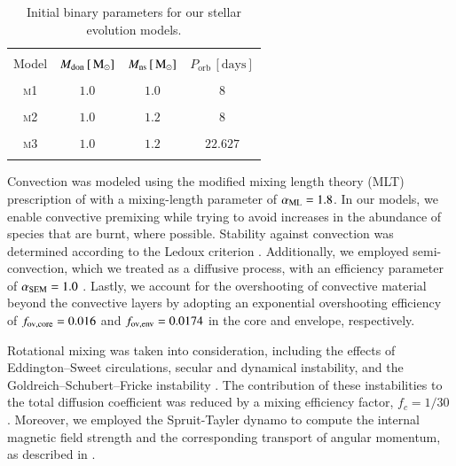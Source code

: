 \documentclass[main.tex]{subfiles}
\begin{document}
        \begin{table}[t]
            \centering
            \caption{Initial binary parameters for our stellar evolution models.}
            \begin{tabular}{cccc}
                 \hline \hline \\
                 Model & $M_\mathrm{don}\,[\mathrm{\,M_\odot}]$ & $M_\mathrm{ns}\,[\mathrm{\,M_\odot}]$ & $P_\mathrm{orb}\,[\mathrm{days}]$  \\
                 \hline \\
                \textsc{m1} & $1.0$ & $1.0$ & $8$ \\\\
                \textsc{m2} & $1.0$ & $1.2$ & $8$ \\\\
                \textsc{m3} & $1.0$ & $1.2$ & $22.627$ \\\\
                \hline
            \end{tabular}
            \label{tab:config}
        \end{table}
        
        Convection was modeled using the modified mixing length theory (MLT) prescription of \cite{Henyey:apj1965} with a mixing-length parameter of $\alpha_{\rm ML} = 1.8$. In our models, we enable convective premixing while trying to avoid increases in the abundance of species that are burnt, where  possible. Stability against convection was determined according to the Ledoux criterion \citep[][]{Ledoux:apj1947}. Additionally, we employed semi-convection, which we treated as a diffusive process, with an efficiency parameter of $\alpha_{\rm SEM} = 1.0$ \citep[][]{Langer:aap1991}. Lastly, we account for the overshooting of convective material beyond the convective layers by adopting an exponential overshooting efficiency of $f_{\rm ov, core} = 0.016$ and $f_{\rm ov, env} = 0.0174$ in the core and envelope, respectively. 
        
        Rotational mixing was taken into consideration, including the effects of Eddington–Sweet circulations, secular and dynamical instability, and the Goldreich–Schubert–Fricke instability \citep[see][for details]{Heger:apj2000}. The contribution of these instabilities to the total diffusion coefficient was reduced by a mixing efficiency factor, $f_c = 1/30$ \citep[][]{1992A&A...253..173C, Heger:apj2000}. Moreover, we employed the Spruit-Tayler dynamo to compute the internal magnetic field strength and the corresponding transport of angular momentum, as described in \cite[][]{Spruit:aap2002, Heger:apj2005}.
        
\end{document}
